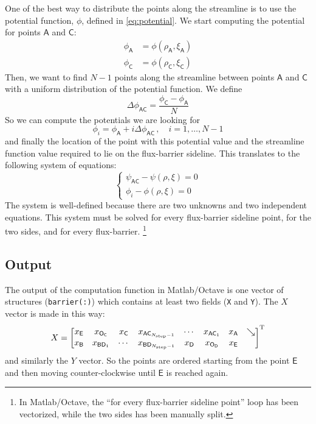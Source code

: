 \documentclass[b5paper,11pt,oneside,fleqn]{article}
\newcommand{\ap}[1]{^\textup{#1}}
\newcommand{\pt}[1]{\mathsf{#1}}
\newcommand{\Nstep}{N_{\textup{step}}}
\begin{document}
One of the best way to distribute the points along the streamline is to use the 
potential function, $ \phi $, defined in \autoref{eq:potential}.
We start computing the potential for points $ \pt{A} $ and $ \pt{C} $:
\begin{equation*}
\begin{aligned}
\phi_\pt{A} &= \phi(\rho_\pt{A}, \xi_\pt{A}) \\
\phi_\pt{C} &= \phi(\rho_\pt{C}, \xi_\pt{C}) 
\end{aligned}
\end{equation*}
Then, we want to find $ N-1 $ points along the streamline
between points $ \pt{A} $ and $ \pt{C} $
with a uniform distribution of the potential function.
We define
\begin{equation*}
\Delta\phi_{\pt{AC}} = \frac{\phi_\pt{C} - \phi_\pt{A}}{N}
\end{equation*}
So we can compute the potentials we are looking for
\[
\phi_i = \phi_\pt{A} + i \Delta\phi_{\pt{AC}} \,,\quad i=1,\ldots,N-1
\]
and finally the location of the point with this potential value and the 
streamline function value required to lie on the flux-barrier sideline.
This translates to the following system of equations:
\begin{equation}
\begin{cases}
\psi_{\pt{AC}} - \psi(\rho,\xi) = 0 \\
\phi_i - \phi(\rho,\xi) = 0
\end{cases}
\end{equation}
The system is well-defined because there are two unknowns and two independent 
equations. This system must be solved for every flux-barrier sideline point, 
for the two sides, and for every flux-barrier.%
\footnote{In Matlab/Octave, the ``for every flux-barrier sideline point'' loop 
has been vectorized, while the two sides has been manually split.}


\subsection{Output}

The output of the computation function in Matlab/Octave is one vector of 
structures (\texttt{barrier(:)}) which contains at least two fields (\texttt{X} 
and \texttt{Y}).
%
The $ X $ vector is made in this way:
\[
X = 
\begin{bmatrix}
x_\pt{E} &
x_{\pt{O}_{\pt{C}}} & 
x_\pt{C} &
%
x_{\pt{AC}_{\Nstep-1}} &
\cdots &
x_{\pt{AC}_1} &
x_\pt{A} &
\searrow \\
%
x_\pt{B} & 
x_{\pt{BD}_1} &
\cdots &
x_{\pt{BD}_{\Nstep-1}} &
%
x_\pt{D} &
x_{\pt{O}_{\pt{D}}} & 
x_\pt{E} 
\end{bmatrix}\ap{T}
\]
and similarly the $ Y $ vector. So the points are ordered starting from the 
point $ \pt{E} $ and then moving counter-clockwise until $ \pt{E} $ is reached 
again.
\end{document}

